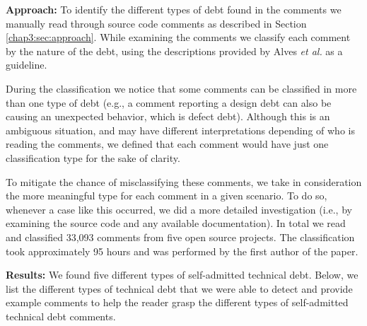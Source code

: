 \vspace{1mm}
\noindent\textbf{Approach:} To identify the different types of debt found in the comments we manually read through source code comments as described in Section \ref{chap3:sec:approach}. While examining the comments we classify each comment by the nature of the debt, using the descriptions provided by Alves \textit{et al.} as a guideline. 

During the classification we notice that some comments can be classified in more than one type of debt (e.g., a comment reporting a design debt can also be causing an unexpected behavior, which is defect debt). Although this is an ambiguous situation, and may have different interpretations depending of who is reading the comments, we defined that each comment would have just one classification type for the sake of clarity. 

To mitigate the chance of misclassifying these comments, we take in consideration the more meaningful type for each comment in a given scenario. To do so, whenever a case like this occurred, we did a more detailed investigation (i.e., by examining the source code and any available documentation). In total we read and classified 33,093 comments from five open source projects. The classification took approximately 95 hours and was performed by the first author of the paper. 

\vspace{1mm}
\noindent\textbf{Results:} We found five different types of self-admitted technical debt. Below, we list the different types of technical debt that we were able to detect and provide example comments to help the reader grasp the different types of self-admitted technical debt comments.


